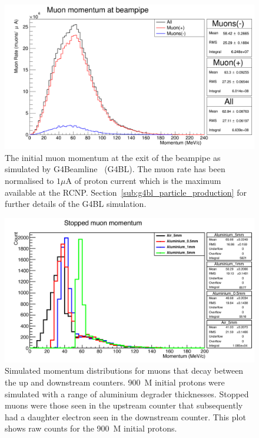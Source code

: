 %
\begin{figure}[htbp]
    \centering
        \includegraphics[width=\textwidth]{images/muon_momentum_at_beam_pipe_exit.png}
    \caption{The initial muon momentum at the exit of the beampipe as simulated by G4Beamline~\cite{G4BL} (G4BL). The muon rate has been normalised to \( 1\mu \)A of proton current which is the maximum available at the RCNP. Section~\ref{sub:g4bl_particle_production} for further details of the G4BL simulation.}
    \label{fig:initial_muon_momentum}
\end{figure}
%
\begin{figure}[htbp]
    \centering
        \includegraphics[width=\textwidth]{images/stopped_muon_momentum.png}
    \caption{Simulated momentum distributions for muons that decay between the up and downstream counters. 900~M initial protons were simulated with a range of aluminium degrader thicknesses. Stopped muons were those seen in the upstream counter that subsequently had a daughter electron seen in the downstream counter. This plot shows raw counts for the 900~M initial protons.}
    \label{fig:stopped_muon_mom}
\end{figure}
